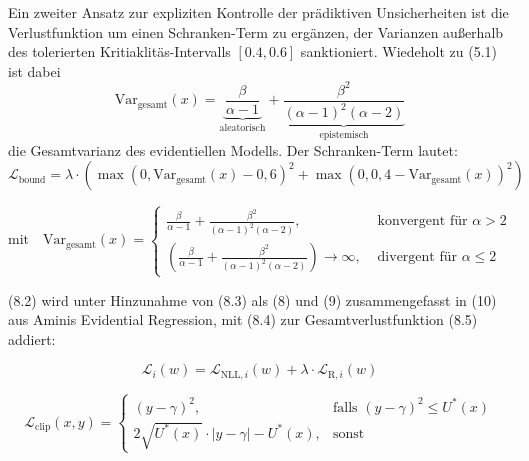 \begin{otherlanguage}{ngerman}
Ein zweiter Ansatz zur expliziten Kontrolle der prädiktiven Unsicherheiten ist die Verlustfunktion um einen Schranken-Term zu ergänzen, der Varianzen außerhalb des tolerierten Kritiaklitäs-Intervalls \([0{.}4, 0{.}6]\) sanktioniert. Wiedeholt zu (5.1) ist dabei \[
\text{Var}_{\text{gesamt}}(x) = \underbrace{\frac{\beta}{\alpha - 1}}_{\text{aleatorisch}} + \underbrace{\frac{\beta^2}{(\alpha - 1)^2(\alpha - 2)}}_{\text{epistemisch}}
\]
die Gesamtvarianz des evidentiellen Modells. Der Schranken-Term lautet:
\begin{equation}
\mathcal{L}_{\text{bound}} = \lambda \cdot \left( 
  \max(0, \text{Var}_{\text{gesamt}}(x) - 0{,}6)^2 
  + \max(0, 0{,}4 - \text{Var}_{\text{gesamt}}(x))^2 
\right)
\label{eq:loss_varbound}
\end{equation}

\vspace{0.125\baselineskip}

\noindent
\begin{minipage}{\linewidth}
\[
\text{mit} \quad
\text{Var}_{\text{gesamt}}(x) =
\begin{cases}
\frac{\beta}{\alpha - 1} + \frac{\beta^2}{(\alpha - 1)^2 (\alpha - 2)},                                         & \text{ konvergent für } \alpha > 2 \\
\left( \frac{\beta}{\alpha - 1} + \frac{\beta^2}{(\alpha - 1)^2 (\alpha - 2)} \right) \longrightarrow \infty,   & \text{ divergent für } \alpha \leq 2
\end{cases}
\]
\vspace{0.125\baselineskip}
\noindent

\end{minipage}

(8.2) wird unter Hinzunahme von (8.3) als (8) und (9) zusammengefasst in (10) aus Aminis Evidential Regression, mit (8.4) zur Gesamtverlustfunktion (8.5) addiert: 

\begin{equation}
\mathcal{L}_i(w) = \mathcal{L}_{\text{NLL},i}(w) + \lambda \cdot \mathcal{L}_{\text{R},i}(w)
\label{eq:evidential_loss}
\end{equation}

\begin{equation}
\mathcal{L}_{\text{clip}}(x, y) =
\begin{cases}
(y - \gamma)^2, & \text{falls } (y - \gamma)^2 \leq U^*(x) \\
2 \sqrt{U^*(x)} \cdot |y - \gamma| - U^*(x), & \text{sonst}
\end{cases}
\end{equation}


\end{otherlanguage}
